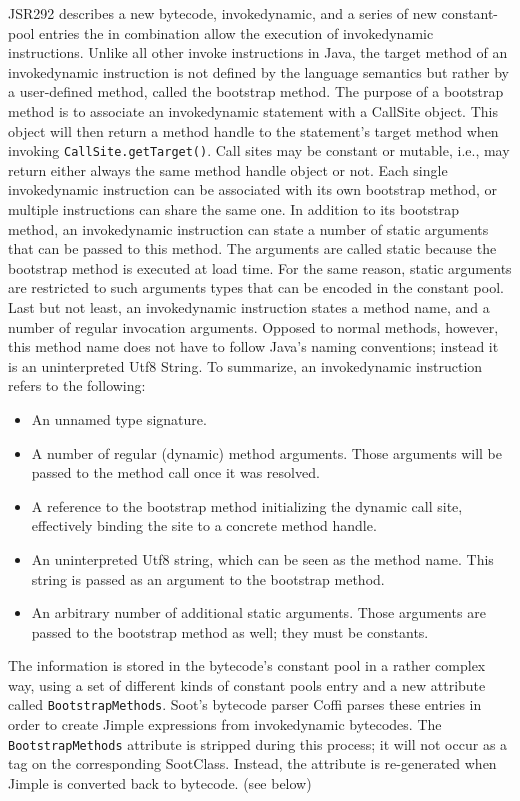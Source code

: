 \documentclass{article}
\newcommand{\id}{invokedynamic\xspace}
\begin{document}
JSR292 describes a new bytecode, \id, and a series of new
constant-pool entries the in combination allow the execution of \id
instructions. Unlike all other invoke instructions in Java, the target method of
an \id instruction is not defined by the language semantics but
rather by a user-defined method, called the bootstrap method. The purpose of a
bootstrap method is to associate an \id statement with a CallSite object. This
object will then return a method handle to the statement's target method when
invoking \texttt{CallSite.getTarget()}. Call sites may be constant or mutable,
i.e., may return either always the same method handle object or not. Each single
\id instruction can be associated with its own bootstrap method, or multiple
instructions can share the same one. In addition to its bootstrap method, an \id
instruction can state a number of static arguments that can be passed to this
method. The arguments are called static because the bootstrap method is executed
at load time. For the same reason, static arguments are restricted to such
arguments types that can be encoded in the constant pool. Last but not least, an
\id instruction states a method name, and a number of regular
invocation arguments. Opposed to normal methods, however, this method name does
not have to follow Java's naming conventions; instead it is an uninterpreted
Utf8 String. To summarize, an \id instruction refers to the following:
\begin{itemize}
  \item An unnamed type signature.
  \item A number of regular (dynamic) method arguments. Those arguments will be
  passed to the method call once it was resolved.
  \item A reference to the bootstrap method initializing the dynamic call site,
  effectively binding the site to a concrete method handle.
  \item An uninterpreted Utf8 string, which can be seen as the method name. This
  string is passed as an argument to the bootstrap method. 
  \item An arbitrary number of additional static arguments. Those arguments are
  passed to the bootstrap method as well; they must be constants.
\end{itemize} 

The information is stored in the bytecode's constant pool in a rather complex
way, using a set of different kinds of constant pools entry and a new attribute
called \texttt{BootstrapMethods}. Soot's bytecode parser Coffi parses these
entries in order to create Jimple expressions from invokedynamic bytecodes.
The \texttt{BootstrapMethods} attribute is stripped during this process; it will
not occur as a tag on the corresponding SootClass. Instead, the attribute is
re-generated when Jimple is converted back to bytecode. (see below)
\end{document}
